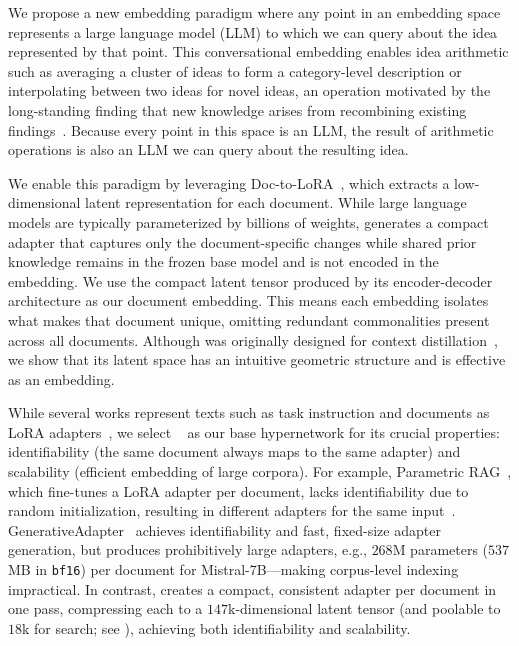 We propose a new embedding paradigm where any point in an embedding space represents a large language model (LLM) to which we can query about the idea represented by that point.
This conversational embedding enables idea arithmetic such as averaging a cluster of ideas to form a category-level description or interpolating between two ideas for novel ideas, an operation motivated by the long-standing finding that new knowledge arises from recombining existing findings~\citep{swanson1986undiscovered,uzzi2013atypical,foster2015tradition,youn2015invention,shibayama2021novelty}.
Because every point in this space is an LLM, the result of arithmetic operations is also an LLM we can query about the resulting idea. 

We enable this paradigm by leveraging Doc-to-LoRA~\citep{sakana2024doc2lora}, which extracts a low-dimensional latent representation for each document. While large language models are typically parameterized by billions of weights, \doctolora generates a compact adapter that captures only the document-specific changes while shared prior knowledge remains in the frozen base model and is not encoded in the embedding.
We use the compact latent tensor produced by its encoder-decoder architecture as our document embedding. 
This means each embedding isolates what makes that document unique, omitting redundant commonalities present across all documents. 
Although \doctolora was originally designed for context distillation~\citep{snell2022context}, we show that its latent space has an intuitive geometric structure and is effective as an embedding.

While several works represent texts such as task instruction and documents as LoRA adapters~\citep{chen2025ga,su2025parametricrag,ye2021hypter,mahabadi2021hyperformer,phang2023hypertuning,charakorn2025texttolora}, we select \doctolora~\citep{sakana2024doc2lora} as our base hypernetwork for its crucial properties: identifiability (the same document always maps to the same adapter) and scalability (efficient embedding of large corpora). 
For example, Parametric RAG~\citep{su2025parametricrag}, which fine-tunes a LoRA adapter per document, lacks identifiability due to random initialization, resulting in different adapters for the same input~\citep{garipov2018loss,frankle2020linear,entezari2022permutation,ainsworth2023gitrebasin}. GenerativeAdapter~\citep{chen2025ga} achieves identifiability and fast, fixed-size adapter generation, but produces prohibitively large adapters, e.g., $268$M parameters ($537$\,MB in \texttt{bf16}) per document for Mistral-7B—making corpus-level indexing impractical. 
In contrast, \doctolora creates a compact, consistent adapter per document in one pass, compressing each to a $147$k-dimensional latent tensor (and poolable to $18$k for search; see ), achieving both identifiability and scalability.

